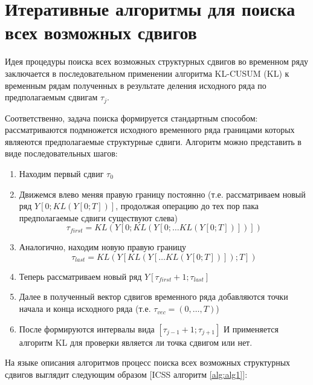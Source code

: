 \documentclass[a4paper,14pt,russian]{extarticle}
\begin{document}
	\section{\label{sec:sec2}Итеративные алгоритмы для поиска всех возможных сдвигов}
	Идея процедуры поиска всех возможных структурных сдвигов во временном ряду заключается в последовательном применении алгоритма KL-CUSUM (KL) к временным рядам полученных в результате деления исходного ряда по предполагаемым сдвигам $\tau_j$.
	\par
	Соответственно, задача поиска формируется стандартным способом: рассматриваются подмножется исходного временного ряда границами которых являеются предполагаемые структурные сдвиги. Алгоритм можно представить в виде последовательных шагов:
	\begin{enumerate}
		\item Находим первый сдвиг $\tau_0$ 
		\item Движемся влево меняя правую границу постоянно (т.е. рассматриваем новый ряд $Y\left[0; KL(Y\left[0; T\right])\right]$, продолжая операцию до тех пор пака предполагаемые сдвиги существуют слева)
		\begin{equation}
			\tau_{first} = KL(Y\left[0; KL(Y\left[0; \dots KL(Y\left[0; T\right]) \right] )   \right])
		\end{equation}
		\item Аналогично, находим новую правую границу
			\begin{equation}
				\tau_{last} = KL(Y\left[KL(Y\left[ \dots KL(Y\left[0; T\right])\right]); T\right])
			\end{equation}
		\item Теперь рассматриваем новый ряд $Y\left[\tau_{first} + 1; \tau_{last}\right]$
		\item Далее в полученный вектор сдвигов временного ряда добавляются точки начала и конца исходного ряда (т.е. $\tau_{vec} = \left( 0, \dots, T \right)$)
		\item После формируются интервалы вида $\left[ \tau_{j - 1} + 1; \tau_{j + 1} \right]$ И применяется алгоритм KL для проверки является ли точка сдвигом или нет.
	\end{enumerate}
	\par
	На языке описания алгоритмов процесс поиска всех возможных структурных сдвигов выглядит следующим образом [ICSS алгоритм \ref{alg:alg1}]:
\end{document}

